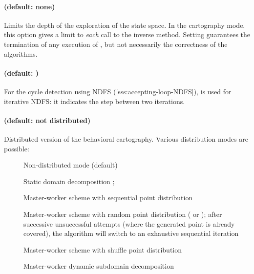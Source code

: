 \paragraph{ (default: none)}
Limits the depth of the exploration of the state space.
In the cartography mode, this option gives a limit to \emph{each} call to the inverse method.
Setting  guarantees the termination of any execution of \imitator{}, but not necessarily the correctness of the algorithms.


\paragraph{ (default: )}
For the cycle detection using NDFS (\cref{sss:accepting-loop-NDFS}),
 is used for iterative NDFS: it indicates the step between two iterations.


\paragraph{ (default: not distributed)}
Distributed version of the behavioral cartography.
Various distribution modes are possible:

\begin{description}
	\item[] Non-distributed mode (default)
	\item[] Static domain decomposition \cite{ACN15}; %
	\item[] Master-worker scheme with sequential point distribution \cite{ACE14}
	\item[] Master-worker scheme with random point distribution (\eg{}  or ); after  successive unsuccessful attempts (where the generated point is already covered), the algorithm will switch to an exhaustive sequential iteration \cite{ACE14}
	\item[] Master-worker scheme with shuffle point distribution \cite{ACN15}
	\item[] Master-worker dynamic subdomain decomposition \cite{ACN15}
\end{description}


